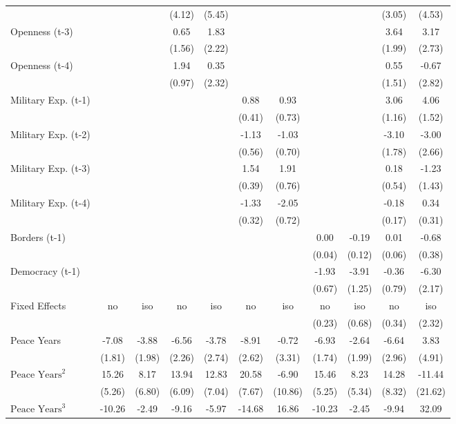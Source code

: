 \begin{tabular}{lcccccccccc}
&  &  & (4.12) & (5.45) &  &  &  &  & (3.05) & (4.53) \\
Openness (t-3) &  &  & 0.65 & 1.83 &  &  &  &  & 3.64 & 3.17 \\
&  &  & (1.56) & (2.22) &  &  &  &  & (1.99) & (2.73) \\
Openness (t-4) &  &  & 1.94 & 0.35 &  &  &  &  & 0.55 & -0.67 \\
&  &  & (0.97) & (2.32) &  &  &  &  & (1.51) & (2.82) \\
Military Exp. (t-1) &  &  &  &  & 0.88 & 0.93 &  &  & 3.06 & 4.06 \\
&  &  &  &  & (0.41) & (0.73) &  &  & (1.16) & (1.52) \\
Military Exp. (t-2) &  &  &  &  & -1.13 & -1.03 &  &  & -3.10 & -3.00 \\
&  &  &  &  & (0.56) & (0.70) &  &  & (1.78) & (2.66) \\
Military Exp. (t-3) &  &  &  &  & 1.54 & 1.91 &  &  & 0.18 & -1.23 \\
&  &  &  &  & (0.39) & (0.76) &  &  & (0.54) & (1.43) \\
Military Exp. (t-4) &  &  &  &  & -1.33 & -2.05 &  &  & -0.18 & 0.34 \\
&  &  &  &  & (0.32) & (0.72) &  &  & (0.17) & (0.31) \\
Borders (t-1) &  &  &  &  &  &  & 0.00 & -0.19 & 0.01 & -0.68 \\
&  &  &  &  &  &  & (0.04) & (0.12) & (0.06) & (0.38) \\
Democracy (t-1) &  &  &  &  &  &  & -1.93 & -3.91 & -0.36 & -6.30 \\
&  &  &  &  &  &  & (0.67) & (1.25) & (0.79) & (2.17) \\
\midrule
Fixed Effects & no & iso & no & iso & no & iso & no & iso & no & iso \\
&  &  &  &  &  &  & (0.23) & (0.68) & (0.34) & (2.32) \\
Peace Years & -7.08 & -3.88 & -6.56 & -3.78 & -8.91 & -0.72 & -6.93 & -2.64 & -6.64 & 3.83 \\
& (1.81) & (1.98) & (2.26) & (2.74) & (2.62) & (3.31) & (1.74) & (1.99) & (2.96) & (4.91) \\
$\text{Peace Years}^2$ & 15.26 & 8.17 & 13.94 & 12.83 & 20.58 & -6.90 & 15.46 & 8.23 & 14.28 & -11.44 \\
& (5.26) & (6.80) & (6.09) & (7.04) & (7.67) & (10.86) & (5.25) & (5.34) & (8.32) & (21.62) \\
$\text{Peace Years}^3$ & -10.26 & -2.49 & -9.16 & -5.97 & -14.68 & 16.86 & -10.23 & -2.45 & -9.94 & 32.09 \\

\end{tabular}

